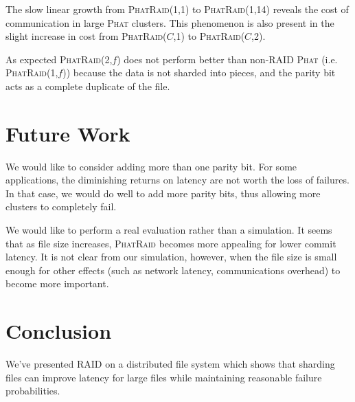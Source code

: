 \documentclass[10pt,letter]{article}
\newcommand{\phat}[0]{\textsc{Phat}}
\newcommand{\phatraid}[0]{\textsc{PhatRaid}}
\newcommand{\phatraidcf}[2]{\textsc{PhatRaid}(#1,#2)}
\begin{document}
The slow linear growth from \phatraidcf{1}{1} to \phatraidcf{1}{14} reveals the
cost of communication in large \phat{} clusters. This phenomenon is also present
in the slight increase in cost from \phatraidcf{$C$}{1} to \phatraidcf{$C$}{2}.

As expected \phatraidcf{2}{$f$} does not perform better than non-RAID \phat{}
(i.e. \phatraidcf{1}{$f$}) because the data is not sharded into pieces, and the
parity bit acts as a complete duplicate of the file.

\section{Future Work}

We would like to consider adding more than one parity bit. For some
applications, the diminishing returns on latency are not worth the loss of
failures. In that case, we would do well to add more parity bits, thus allowing
more clusters to completely fail.

We would like to perform a real evaluation rather than a simulation.  It seems
that as file size increases, \phatraid{} becomes more appealing for lower commit
latency. It is not clear from our simulation, however, when the file size is
small enough for other effects (such as network latency, communications
overhead) to become more important.

\section{Conclusion}

We've presented RAID on a distributed file system which shows that sharding
files can improve latency for large files while maintaining reasonable failure
probabilities.



\end{document}
